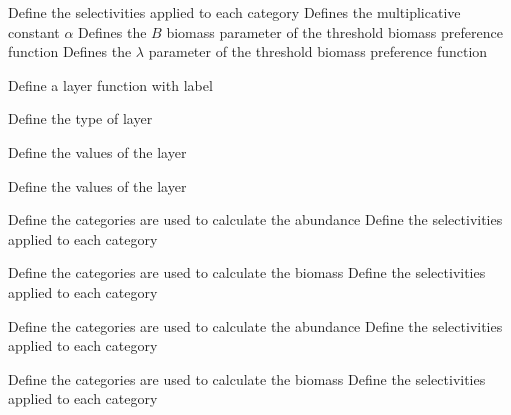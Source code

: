  {Define the selectivities applied to each category}
 {Defines the multiplicative constant $\alpha$}
 {Defines the $B$ biomass parameter of the threshold biomass preference function}
 {Defines the $\lambda$ parameter of the threshold biomass preference function}
\par{} {Define a layer function with label}\par
{} {Define the type of layer}
\par\textbf{}\par
{} {Define the values of the layer}
\par\textbf{}\par
{} {Define the values of the layer}
\par\textbf{}\par
\par\textbf{}\par
{} {Define the categories are used to calculate the abundance}
 {Define the selectivities applied to each category}
\par\textbf{}\par
{} {Define the categories are used to calculate the biomass}
 {Define the selectivities applied to each category}
\par\textbf{}\par
{} {Define the categories are used to calculate the abundance}
 {Define the selectivities applied to each category}
\par\textbf{}\par
{} {Define the categories are used to calculate the biomass}
 {Define the selectivities applied to each category}
\par\textbf{}\par
